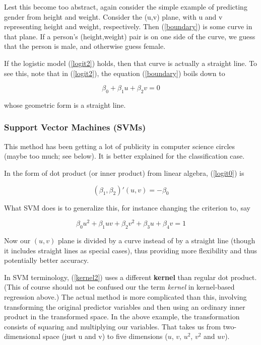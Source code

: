 Lest this become too abstract, again consider the simple example of
predicting gender from height and weight.  Consider the (u,v) plane,
with u and v representing height and weight, respectively.  Then
(\ref{boundary}) is some curve in that plane.  If a person's
(height,weight) pair is on one side of the curve, we guess that the
person is male, and otherwise guess female.

If the logistic model (\ref{logit2}) holds, then that curve is actually
a straight line.  To see this, note that in (\ref{logit2}), the equation
(\ref{boundary}) boils down to 

\begin{equation}
\label{logit0}
\beta_0+\beta_1 u + \beta_2 v = 0
\end{equation}

whose geometric form is a straight line.

\subsubsection{Support Vector Machines (SVMs)}

This method has been getting a lot of publicity in computer science
circles (maybe too much; see below).  It is better explained for the
classification case.

In the form of dot product (or inner product) from linear algebra,
(\ref{logit0}) is

\begin{equation}
\label{dotprod}
(\beta_1, \beta_2)' (u,v) = -\beta_0
\end{equation}

What SVM does is to generalize this, for instance changing the criterion
to, say

\begin{equation}
\label{kernel2}
\beta_0 u^2 + \beta_1 uv + \beta_2 v^2 + \beta_3 u + \beta_4 v = 1
\end{equation}

Now our $(u,v)$ plane is divided by a curve instead of by a straight
line (though it includes straight lines as special cases), thus
providing more flexibility and thus potentially better accuracy.

In SVM terminology, (\ref{kernel2}) uses a different {\bf kernel} than
regular dot product.  (This of course should not be confused our the
term {\it kernel} in kernel-based regression above.)  The actual method
is more complicated than this, involving transforming the original
predictor variables and then using an ordinary inner product in the
transformed space.  In the above example, the transformation consists of
squaring and multiplying our variables.  That takes us from
two-dimensional space (just u and v) to five dimensions ($u$, $v$,
$u^2$, $v^2$ and $uv$).

